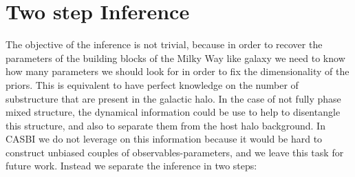 \section{Two step Inference}\label{sec:Two step Inference}
The objective of the inference is not trivial, because in order to recover the parameters of the building blocks of the Milky Way like galaxy we need to know how many parameters we should look for in order to fix the dimensionality of the priors. This is equivalent to have perfect knowledge on the number of substructure that are present in the galactic halo. In the case of not fully phase mixed structure, the dynamical information could be use to help to disentangle this structure, and also to separate them from the host halo background. In CASBI we do not leverage on this information because it would be hard to construct unbiased couples of observables-parameters, and we leave this task for future work. Instead we separate the inference in two steps:
